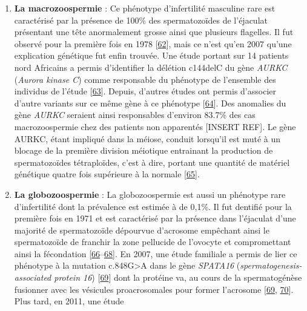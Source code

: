 \documentclass[12pt,twoside]{reedthesis}
\providecommand{\tightlist}{%
  \setlength{\itemsep}{0pt}\setlength{\parskip}{0pt}}
\theoremstyle{definition}
\theoremstyle{definition}
\theoremstyle{remark}
\begin{document}
\begin{enumerate}
    \begin{enumerate}
    \def\labelenumii{\alph{enumii}.}
    \tightlist
    \item
      \textbf{La macrozoospermie} : Ce phénotype d'infertilité masculine
      rare est caractérisé par la présence de 100\% des spermatozoïdes de
      l'éjaculat présentant une tête anormalement grosse ainsi que
      plusieurs flagelles. Il fut observé pour la première fois en 1978
      {[}\protect\hyperlink{ref-Nistal}{62}{]}, mais ce n'est qu'en 2007
      qu'une explication génétique fut enfin trouvée. Une étude portant
      sur 14 patients nord Africains a permis d'identifier la délétion
      c144delC du gène \emph{AURKC} (\emph{Aurora kinase C}) comme
      responsable du phénotype de l'ensemble des individus de l'étude
      {[}\protect\hyperlink{ref-Dieterich2007}{63}{]}. Depuis, d'autres
      études ont permis d'associer d'autre variants sur ce même gène à ce
      phénotype {[}\protect\hyperlink{ref-BenKhelifa2011}{64}{]}. Des
      anomalies du gène \emph{AURKC} seraient ainsi responsables d'environ
      83.7\% des cas macrozoospermie chez des patients non apparentés
      {[}INSERT REF{]}. Le gène AURKC, étant impliqué dans la méiose,
      conduit lorsqu'il est muté à un blocage de la première division
      méiotique entrainant la production de spermatozoïdes tétraploïdes,
      c'est à dire, portant une quantité de matériel génétique quatre fois
      supérieure à la normale
      {[}\protect\hyperlink{ref-Dieterich2009}{65}{]}.\\
    \item
      \textbf{La globozoospermie} : La globozoospermie est aussi un
      phénotype rare d'infertilité dont la prévalence est estimée à de
      0,1\%. Il fut dentifié pour la première fois en 1971 et est
      caractérisé par la présence dans l'éjaculat d'une majorité de
      spermatozoïde dépourvue d'acrosome empêchant ainsi le spermatozoïde
      de franchir la zone pellucide de l'ovocyte et compromettant ainsi la
      fécondation
      {[}\protect\hyperlink{ref-Dam2006}{66}--\protect\hyperlink{ref-Holstein1973}{68}{]}.
      En 2007, une étude familiale a permis de lier ce phénotype à la
      mutation c.848G\textgreater{}A dans le gène \emph{SPATA16}
      (\emph{spermatogenesis-associated protein 16})
      {[}\protect\hyperlink{ref-Dam2007a}{69}{]} dont la protéine va, au
      cours de la spermatogénèse fusionner avec les vésicules
      proacrosomales pour former l'acrosome
      {[}\protect\hyperlink{ref-Dam2007a}{69},
      \protect\hyperlink{ref-Lu2006}{70}{]}. Plus tard, en 2011, une étude

\end{enumerate}
\end{enumerate}
\end{document}
